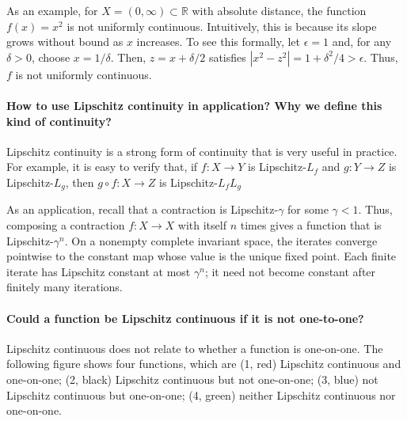 \documentclass[10pt,english]{article}
\begin{document}
As an example, for $X=(0,\infty)\subset \mathbb{R}$ with absolute distance, the function $f(x)=x^2$ is not uniformly continuous.
Intuitively, this is because its slope grows without bound as $x$ increases.
To see this formally, let $\epsilon = 1$ and, for any $\delta >0$, choose $x=1/\delta$.
Then, $z=x+\delta/2$ satisfies $|x^2 - z^2| = 1+\delta^2 / 4 > \epsilon$.
Thus, $f$ is not uniformly continuous.


\paragraph{How to use Lipschitz continuity in application? Why we define this kind of continuity?} %

Lipschitz continuity is a strong form of continuity that is very useful in practice.
For example, it is easy to verify that, if $f\colon X \to Y$ is Lipschitz-$L_f$ and $g \colon Y \to Z$ is Lipschitz-$L_g$, then $g \circ f \colon X \to Z$ is Lipschitz-$L_f L_g$

As an application, recall that a contraction is Lipschitz-$\gamma$ for some $\gamma <1$.
Thus, composing a contraction $f \colon X \to X$ with itself $n$ times gives a function that is Lipschitz-$\gamma^n$.
On a nonempty complete invariant space, the iterates converge pointwise to the constant map whose value is the unique fixed point.
Each finite iterate has Lipschitz constant at most $\gamma^n$; it need not become constant after finitely many iterations.


\paragraph{Could a function be Lipschitz continuous if it is not one-to-one?}

Lipschitz continuous does not relate to whether a function is one-on-one. The following figure shows four functions, which are (1, red) Lipschitz continuous and one-on-one; (2, black) Lipschitz continuous but not one-on-one; (3, blue) not Lipschitz continuous but one-on-one; (4, green) neither Lipschitz continuous nor one-on-one.
\end{document}
